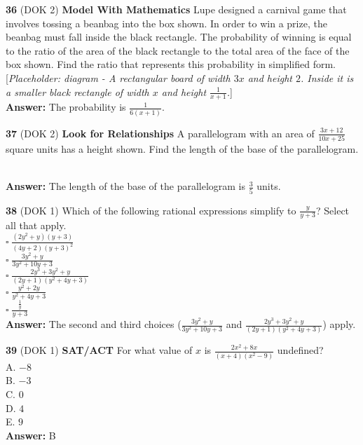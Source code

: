 \documentclass{article}
\newenvironment{practice}[2]{\textbf{#1} (DOK #2)}{}
\newcommand{\answer}[1]{\textbf{Answer:} #1}
\newcommand{\placeholder}[2]{[\textit{Placeholder: #1 - #2}]}
\begin{document}
\begin{practice}{36}{2}
\textbf{Model With Mathematics} Lupe designed a carnival game that involves tossing a beanbag into the box shown. In order to win a prize, the beanbag must fall inside the black rectangle. The probability of winning is equal to the ratio of the area of the black rectangle to the total area of the face of the box shown. Find the ratio that represents this probability in simplified form.
\placeholder{diagram}{A rectangular board of width $3x$ and height $2$. Inside it is a smaller black rectangle of width $x$ and height $\frac{1}{x+1}$.} \\
\answer{The probability is $\frac{1}{6(x+1)}$.}
\end{practice}

\begin{practice}{37}{2}
\textbf{Look for Relationships} A parallelogram with an area of $\frac{3x+12}{10x+25}$ square units has a height shown. Find the length of the base of the parallelogram.
 \\
\answer{The length of the base of the parallelogram is $\frac{3}{5}$ units.}
\end{practice}

\begin{practice}{38}{1}
Which of the following rational expressions simplify to $\frac{y}{y+3}$? Select all that apply. \\
$\square \; \frac{(2y^2+y)(y+3)}{(4y+2)(y+3)^2}$ \\
$\square \; \frac{3y^2+y}{3y^2+10y+3}$ \\
$\square \; \frac{2y^3+3y^2+y}{(2y+1)(y^2+4y+3)}$ \\
$\square \; \frac{y^2+2y}{y^2+4y+3}$ \\
$\square \; \frac{\frac{1}{y}}{y+3}$ \\
\answer{The second and third choices ($\frac{3y^2+y}{3y^2+10y+3}$ and $\frac{2y^3+3y^2+y}{(2y+1)(y^2+4y+3)}$) apply.}
\end{practice}

\begin{practice}{39}{1}
\textbf{SAT/ACT} For what value of $x$ is $\frac{2x^2+8x}{(x+4)(x^2-9)}$ undefined? \\
A. $-8$ \\
B. $-3$ \\
C. $0$ \\
D. $4$ \\
E. $9$ \\
\answer{B}
\end{practice}
\end{document}
